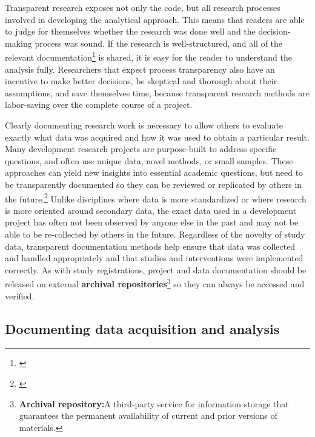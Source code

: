 \documentclass[]{tufte-book}
\begin{document}
Transparent research exposes not only the code, but all research
processes involved in developing the analytical approach. This means
that readers are able to judge for themselves whether the research was
done well and the decision-making process was sound. If the research is
well-structured, and all of the relevant documentation\footnote{\href{https://dimewiki.worldbank.org/Research_Documentation}{}}
is shared, it is easy for the reader to understand the analysis fully.
Researchers that expect process transparency also have an incentive to
make better decisions, be skeptical and thorough about their
assumptions, and save themselves time, because transparent research
methods are labor-saving over the complete course of a project.

Clearly documenting research work is necessary to allow others to
evaluate exactly what data was acquired and how it was used to obtain a
particular result. Many development research projects are purpose-built
to address specific questions, and often use unique data, novel methods,
or small samples. These approaches can yield new insights into essential
academic questions, but need to be transparently documented so they can
be reviewed or replicated by others in the future.\footnote{\cite{@duvendack2017meant}}
Unlike disciplines where data is more standardized or where research is
more oriented around secondary data, the exact data used in a
development project has often not been observed by anyone else in the
past and may not be able to be re-collected by others in the future.
Regardless of the novelty of study data, transparent documentation
methods help ensure that data was collected and handled appropriately
and that studies and interventions were implemented correctly. As with
study registrations, project and data documentation should be released
on external \textbf{archival repositories}\footnote{\textbf{Archival
  repository:}A third-party service for information storage that
  guarantees the permanent availability of current and prior versions of
  materials.} so they can always be accessed
and verified.

\hypertarget{documenting-data-acquisition-and-analysis}{%
\subsection*{Documenting data acquisition and
analysis}\label{documenting-data-acquisition-and-analysis}}
\end{document}
